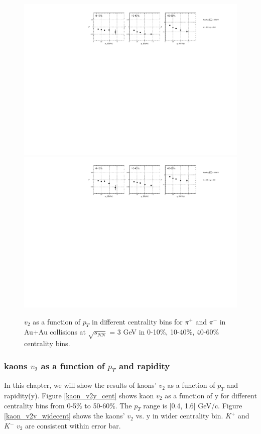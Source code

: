 \begin{figure}[h]
\includegraphics[scale=0.5]{chapter3/fig/v2ptpikp/pionp_v2pt_wide_cent.pdf}
\includegraphics[scale=0.5]{chapter3/fig/v2ptpikp/pionm_v2pt_wide_cent.pdf}
\caption{$v_{2}$ as a function of $p_{T}$ in different centrality bins for $\pi^{+}$ and $\pi^{-}$ in Au+Au collisions at $\sqrt{s_{NN}}$ = 3 GeV in 0-10\%, 10-40\%, 40-60\% centrality bins.}
\label{pion_v2pt_widecent}
\end{figure}



\clearpage


\subsubsection{kaons $v_{2}$ as a function of $p_{T}$ and rapidity}
In this chapter, we will show the results of kaons' $v_{2}$ as a function of $p_{T}$ and rapidity(y).
Figure \ref{kaon_v2y_cent} shows kaon $v_{2}$ as a function of y for different centrality bins from 0-5\% to 50-60\%. The $p_{T}$ range is [0.4, 1.6] GeV/c. Figure \ref{kaon_v2y_widecent} shows the kaons' $v_{2}$ vs. y in wider centrality bin. $K^{+}$ and $K^{-}$ $v_{2}$ are consistent within error bar.



